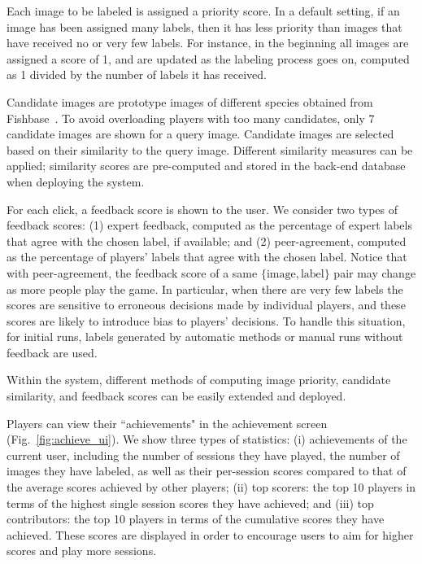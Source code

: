 \documentclass{sig-alternate}
\begin{document}
Each image to be labeled is assigned a priority score. 
In a default setting, if an image has been assigned many labels, then it has less priority
than images that have received no or very few labels. 
For instance, in the beginning all images are assigned a score of 1, 
and are updated as the labeling process goes on, computed as 1 divided by the number of labels it has received. 

Candidate images are prototype images of different species obtained from Fishbase~\cite{fisbase}. %
To avoid overloading players with too many candidates, only 7 candidate images are shown for a query image. 
Candidate images are selected based on their similarity to the query image.
Different similarity measures can be applied; similarity scores are pre-computed and stored
in the back-end database when deploying the system. 

For each click, a feedback score is shown to the user. 
We consider two types of feedback scores: (1) expert feedback, computed as
the percentage of expert labels that agree with the chosen label,  if available; 
and (2) peer-agreement,  computed as the percentage of players' labels that agree
with the chosen label. 
%
Notice that with peer-agreement, the feedback score of a same $\{\text{image}, \text{label}\}$ pair may change
as more people play the game. In particular, when there are very few labels the scores are sensitive to erroneous decisions made by individual players, 
and these scores are likely to introduce bias to players' decisions. 
%
To handle this situation, for initial runs, labels generated by automatic methods or manual runs without feedback 
are used. 
%

Within the system, different methods of computing image priority, candidate similarity, 
and feedback scores can be easily extended and deployed. 

Players can view their ``achievements" in the achievement screen (Fig.~\ref{fig:achieve_ui}). 
We show three types of statistics:
(i) achievements of the current user, including the number of sessions they have played, the number of images
they have labeled, as well as their per-session scores compared to that of the average scores achieved by other players; 
(ii) top scorers: the top 10 players in terms of the highest single session scores they have achieved;
and (iii) top contributors: the top 10 players in terms of the cumulative scores they have achieved. 
These scores are displayed in order to encourage users to aim for higher scores and play more sessions.
\end{document}
